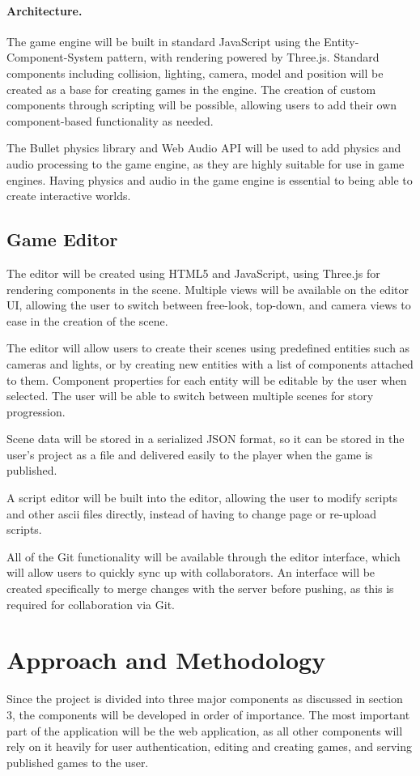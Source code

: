 \documentclass[a4paper, 12pt]{article}
\begin{document}
\paragraph{Architecture.}
The game engine will be built in standard JavaScript using the Entity-Component-System pattern, with rendering powered by Three.js. Standard components including collision, lighting, camera, model and position will be created as a base for creating games in the engine. The creation of custom components through scripting will be possible, allowing users to add their own component-based functionality as needed.

The Bullet physics library and Web Audio API will be used to add physics and audio processing to the game engine, as they are highly suitable for use in game engines. Having physics and audio in the game engine is essential to being able to create interactive worlds.

\subsection{Game Editor}
The editor will be created using HTML5 and JavaScript, using Three.js for rendering components in the scene. Multiple views will be available on the editor UI, allowing the user to switch between free-look, top-down, and camera views to ease in the creation of the scene.

The editor will allow users to create their scenes using predefined entities such as cameras and lights, or by creating new entities with a list of components attached to them. Component properties for each entity will be editable by the user when selected. The user will be able to switch between multiple scenes for story progression.

Scene data will be stored in a serialized JSON format, so it can be stored in the user's project as a file and delivered easily to the player when the game is published.

A script editor will be built into the editor, allowing the user to modify scripts and other ascii files directly, instead of having to change page or re-upload scripts.

All of the Git functionality will be available through the editor interface, which will allow users to quickly sync up with collaborators. An interface will be created specifically to merge changes with the server before pushing, as this is required for collaboration via Git.

\section{Approach and Methodology}
Since the project is divided into three major components as discussed in section 3, the components will be developed in order of importance. The most important part of the application will be the web application, as all other components will rely on it heavily for user authentication, editing and creating games, and serving published games to the user.
\end{document}
